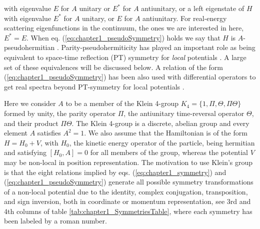 with eigenvalue $E$ for $A$ unitary or $E^*$ for $A$ antiunitary, or a left eigenstate of $H$ with eigenvalue $E^*$ for $A$ unitary, or $E$
for $A$ antiunitary. For real-energy scattering
eigenfunctions in the continuum, the ones we are interested in here, $E^*=E$.
When eq. (\ref{eq:chapter1_pseudoSymmetry}) holds we say that $H$ is $A$-pseudohermitian \cite{Mostafazadeh2010}.
Parity-pseudohermiticity has played an important role as being equivalent to space-time reflection (PT) symmetry for {\it local} potentials
\cite{Mostafazadeh2010,Znojil2015}. A large set of these equivalences
will be discussed below.
A relation of the form (\ref{eq:chapter1_pseudoSymmetry}) has been also used with differential operators  to get real spectra beyond
PT-symmetry for local potentials  \cite{Nixon2016,Nixon2016a}.

Here we consider
$A$ to be a member of the
Klein 4-group $K_4=\{1,\Pi, \Theta, \Pi\Theta\}$ formed by unity, the parity operator $\Pi$, the antiunitary time-reversal operator $\Theta$, and their product
$\Pi\Theta$. The Klein 4-group is a discrete, abelian group and every element $A$ satisfies $A^2 = 1$. We also assume that the  Hamiltonian is  of the form $H=H_0+V$, with $H_0$, the kinetic energy operator of the particle,
being hermitian and
satisfying $[H_0,A]=0$ for all members of the group, whereas the potential $V$ may be non-local in position representation.
The  motivation to use Klein's group is that the eight relations implied by eqs. (\ref{eq:chapter1_symmetry}) and (\ref{eq:chapter1_pseudoSymmetry}) generate all
possible symmetry transformations of a non-local potential due to the identity, complex conjugation, transposition, and sign inversion,
both in coordinate or momentum representation, see 3rd and 4th columns of table \ref{tab:chapter1_SymmetriesTable}, where each symmetry has been labeled by a roman number.


